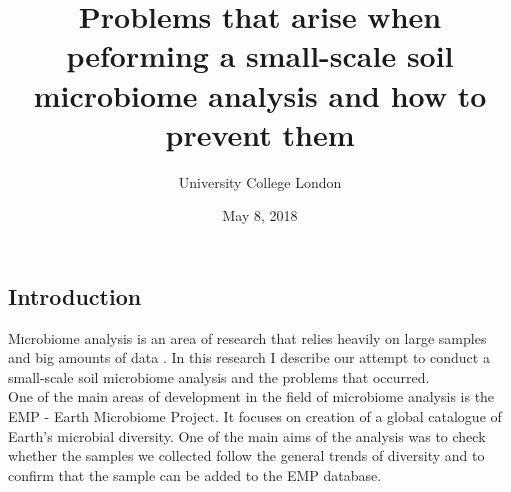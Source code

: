 \documentclass{article}
\title{Problems that arise when peforming a small-scale soil microbiome analysis and how to prevent them}
\author{
\normalsize University College London \\
}
\date{May 8, 2018}
\begin{document}
\setcounter{page}{1}
\maketitle
\begin{multicols}{2}
\section{Introduction}
\lettrine[nindent=0em,lines=3]{M}icrobiome analysis is an area of research that relies heavily on large samples and big amounts of data \cite{Thompson2017}. In this research I describe our attempt to conduct a small-scale soil microbiome analysis and the problems that occurred.\\
One of the main areas of development in the field of microbiome analysis is the EMP - Earth Microbiome Project\cite{Gilbert2014}. It focuses on creation of a global catalogue of Earth's microbial diversity.
One of the main aims of the analysis was to check whether the samples we collected follow the general trends of diversity and to confirm that the sample can be added to the EMP database.

\end{multicols}
\end{document}
